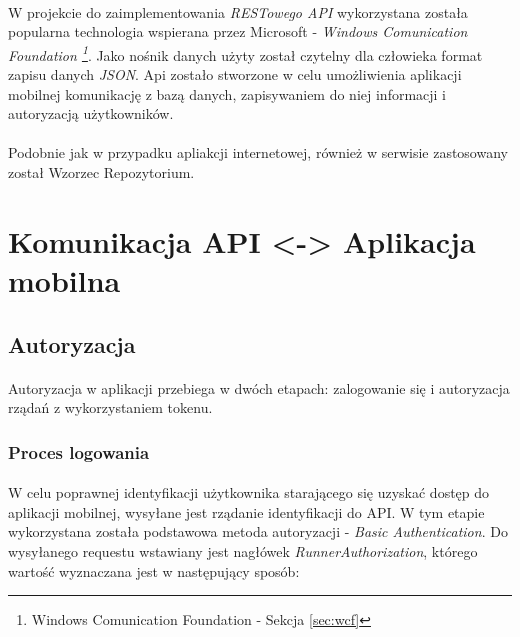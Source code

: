\paragraph{} %
\label{par:}
W projekcie do zaimplementowania \textit{RESTowego API} wykorzystana została popularna technologia wspierana przez Microsoft - \textit{Windows Comunication Foundation \footnote{ Windows Comunication Foundation - Sekcja \ref{sec:wcf}}}. Jako nośnik danych użyty został czytelny dla człowieka format zapisu danych \textit{JSON}. Api zostało stworzone w celu umożliwienia aplikacji mobilnej komunikację z bazą danych, zapisywaniem do niej informacji i autoryzacją użytkowników.

\paragraph{} %
\label{par:}
Podobnie jak w przypadku apliakcji internetowej, również w serwisie zastosowany został Wzorzec Repozytorium.

\section{Komunikacja API <-> Aplikacja mobilna} %
\label{sec:komunikacja_api_aplikacja_mobilna}

\subsection{Autoryzacja} %
\label{sub:autoryzacja}
\paragraph{} %
\label{par:}

Autoryzacja w aplikacji przebiega w dwóch etapach: zalogowanie się i autoryzacja rządań z wykorzystaniem tokenu. 
\subsubsection{Proces logowania} 
\paragraph{} %
\label{par:}
W celu poprawnej identyfikacji użytkownika starającego się uzyskać dostęp do aplikacji mobilnej, wysyłane jest rządanie identyfikacji do API. W tym etapie wykorzystana została podstawowa metoda autoryzacji - \textit{Basic Authentication}. Do wysyłanego requestu wstawiany jest nagłówek \textit{RunnerAuthorization}, którego wartość wyznaczana jest w następujący sposób:

